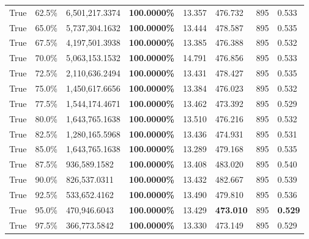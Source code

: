 \begin{table}[H]
\begin{tabular}{lllrllll}
\cline{1-8}
True & 62.5\% & 6,501,217.3374 & \bfseries \color{red} 100.0000\% & 13.357 & 476.732 & 895 & 0.533 \\
\cline{1-8}
True & 65.0\% & 5,737,304.1632 & \bfseries \color{red} 100.0000\% & 13.444 & 478.587 & 895 & 0.535 \\
\cline{1-8}
True & 67.5\% & 4,197,501.3938 & \bfseries \color{red} 100.0000\% & 13.385 & 476.388 & 895 & 0.532 \\
\cline{1-8}
True & 70.0\% & 5,063,153.1532 & \bfseries \color{red} 100.0000\% & 14.791 & 476.856 & 895 & 0.533 \\
\cline{1-8}
True & 72.5\% & 2,110,636.2494 & \bfseries \color{red} 100.0000\% & 13.431 & 478.427 & 895 & 0.535 \\
\cline{1-8}
True & 75.0\% & 1,450,617.6656 & \bfseries \color{red} 100.0000\% & 13.384 & 476.023 & 895 & 0.532 \\
\cline{1-8}
True & 77.5\% & 1,544,174.4671 & \bfseries \color{red} 100.0000\% & 13.462 & 473.392 & 895 & 0.529 \\
\cline{1-8}
True & 80.0\% & 1,643,765.1638 & \bfseries \color{red} 100.0000\% & 13.510 & 476.216 & 895 & 0.532 \\
\cline{1-8}
True & 82.5\% & 1,280,165.5968 & \bfseries \color{red} 100.0000\% & 13.436 & 474.931 & 895 & 0.531 \\
\cline{1-8}
True & 85.0\% & 1,643,765.1638 & \bfseries \color{red} 100.0000\% & 13.289 & 479.168 & 895 & 0.535 \\
\cline{1-8}
True & 87.5\% & 936,589.1582 & \bfseries \color{red} 100.0000\% & 13.408 & 483.020 & 895 & 0.540 \\
\cline{1-8}
True & 90.0\% & 826,537.0311 & \bfseries \color{red} 100.0000\% & 13.432 & 482.667 & 895 & 0.539 \\
\cline{1-8}
True & 92.5\% & 533,652.4162 & \bfseries \color{red} 100.0000\% & 13.490 & 479.810 & 895 & 0.536 \\
\cline{1-8}
True & 95.0\% & 470,946.6043 & \bfseries \color{red} 100.0000\% & 13.429 & \bfseries \color{red} 473.010 & 895 & \bfseries \color{red} 0.529 \\
\cline{1-8}
True & 97.5\% & 366,773.5842 & \bfseries \color{red} 100.0000\% & 13.330 & 473.149 & 895 & 0.529 \\
\cline{1-8}
\bottomrule
\end{tabular}
\end{table}
